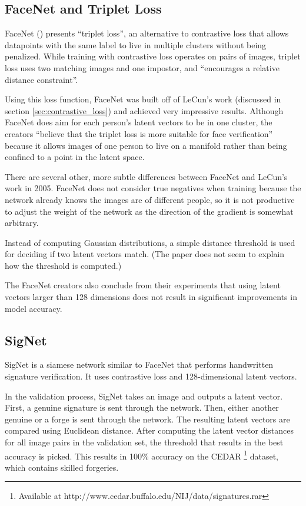 \subsection{FaceNet and Triplet Loss} %

FaceNet (\cite{triple_loss}) presents ``triplet loss'', an alternative to contrastive loss that allows datapoints with the same label to live in multiple clusters without being penalized.
While training with contrastive loss operates on pairs of images, triplet loss uses two matching images and one impostor, and ``encourages a relative distance constraint''\cite{face_net}.

Using this loss function, FaceNet was built off of LeCun's work (discussed in section \ref{sec:contrastive_loss}) and achieved very impressive results\cite{face_net}.
Although FaceNet does aim for each person's latent vectors to be in one cluster, the creators ``believe that the triplet loss is more suitable for face verification'' because it allows images of one person to live on a manifold rather than being confined to a point in the latent space\cite{face_net}.

There are several other, more subtle differences between FaceNet and LeCun's work in 2005.
FaceNet does not consider true negatives when training because the network already knows the images are of different people, so it is not productive to adjust the weight of the network as the direction of the gradient is somewhat arbitrary.

Instead of computing Gaussian distributions, a simple distance threshold is used for deciding if two latent vectors match.
(The paper does not seem to explain how the threshold is computed.)

The FaceNet creators also conclude from their experiments that using latent vectors larger than 128 dimensions does not result in significant improvements in model accuracy\cite{face_net}.


\subsection{SigNet}\label{sec:sig_net}

SigNet is a siamese network similar to FaceNet that performs handwritten signature verification.
It uses contrastive loss and 128-dimensional latent vectors.

In the validation process, SigNet takes an image and outputs a latent vector.
First, a genuine signature is sent through the network.
Then, either another genuine or a forge is sent through the network.
The resulting latent vectors are compared using Euclidean distance.
After computing the latent vector distances for all image pairs in the validation set, the threshold that results in the best accuracy is picked.
This results in 100\% accuracy on the CEDAR \footnote{Available at http://www.cedar.buffalo.edu/NIJ/data/signatures.rar} dataset, which contains skilled forgeries.

